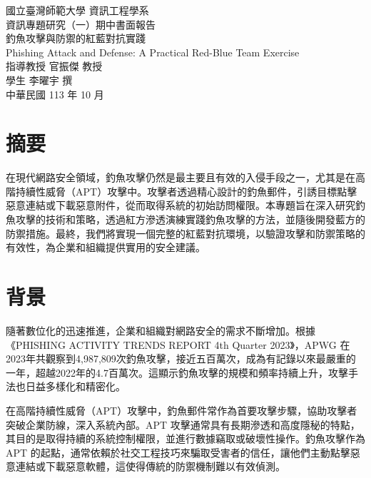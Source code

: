 \documentclass[a4paper,12pt]{article}
\begin{document}
\begin{titlepage}
  \begin{center}
    \vspace*{2cm}
    {\fontsize{16pt}{16pt}\selectfont 國立臺灣師範大學 資訊工程學系}\\[1cm]
    {\fontsize{16pt}{16pt} 資訊專題研究（一）期中書面報告}\\[4cm]
    {\fontsize{16pt}{16pt}\selectfont 釣魚攻擊與防禦的紅藍對抗實踐}\\[1cm]
    {\fontsize{16pt}{16pt}\selectfont Phishing Attack and Defense: A Practical Red-Blue Team Exercise}\\[9cm]
    {\fontsize{12pt}{12pt}\selectfont 指導教授 官振傑 教授}\\[0.5cm]
    {\fontsize{12pt}{12pt}\selectfont 學生 李曜宇 撰}\\[0.5cm]
    {\fontsize{12pt}{12pt}\selectfont 中華民國 113 年 10 月}
  \end{center}
\end{titlepage}

\newpage

\section*{摘要}
在現代網路安全領域，釣魚攻擊仍然是最主要且有效的入侵手段之一，尤其是在高階持續性威脅（APT）攻擊中。攻擊者透過精心設計的釣魚郵件，引誘目標點擊惡意連結或下載惡意附件，從而取得系統的初始訪問權限。本專題旨在深入研究釣魚攻擊的技術和策略，透過紅方滲透演練實踐釣魚攻擊的方法，並隨後開發藍方的防禦措施。最終，我們將實現一個完整的紅藍對抗環境，以驗證攻擊和防禦策略的有效性，為企業和組織提供實用的安全建議。

\section{背景}
隨著數位化的迅速推進，企業和組織對網路安全的需求不斷增加。根據《PHISHING ACTIVITY TRENDS REPORT 4th Quarter 2023》，APWG 在2023年共觀察到4,987,809次釣魚攻擊，接近五百萬次，成為有記錄以來最嚴重的一年，超越2022年的4.7百萬次。這顯示釣魚攻擊的規模和頻率持續上升，攻擊手法也日益多樣化和精密化。\cite{apwg2023}

在高階持續性威脅（APT）攻擊中，釣魚郵件常作為首要攻擊步驟，協助攻擊者突破企業防線，深入系統內部。APT 攻擊通常具有長期滲透和高度隱秘的特點，其目的是取得持續的系統控制權限，並進行數據竊取或破壞性操作。釣魚攻擊作為 APT 的起點，通常依賴於社交工程技巧來騙取受害者的信任，讓他們主動點擊惡意連結或下載惡意軟體，這使得傳統的防禦機制難以有效偵測。
\end{document}
